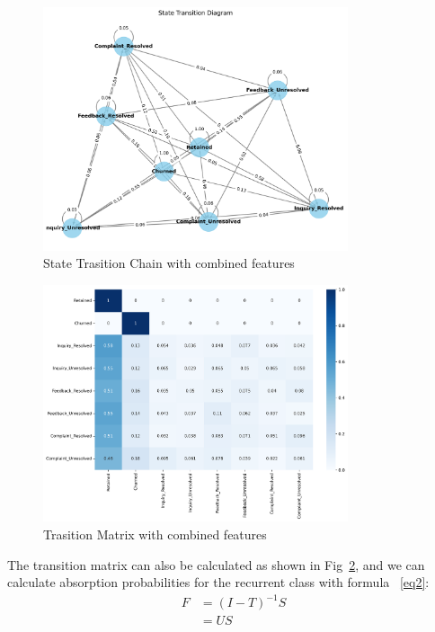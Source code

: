 \documentclass[journal=gmj]{CUP-JNL-DTM}%
\theoremstyle{definition}
\numberwithin{equation}{section}
\begin{document}
\begin{figure}[h]
    \centering
    \includegraphics[width=0.8\textwidth]{Plots/chain_interactiontype.png}
    
    \caption{State Trasition Chain with combined features}
    \label{fig:interactiontype_chain}
\end{figure}

\begin{figure}[h]
    \centering
    \includegraphics[width=0.8\textwidth]{Plots/transition_matrix.png}
    
    \caption{Trasition Matrix with combined features}
    \label{fig:transition_matrix}
\end{figure}

The transition matrix can also be calculated as shown in Fig~\ref{fig:transition_matrix}, and we can calculate absorption probabilities for the recurrent class with formula ~\ref{eq2}:
\begin{equation}
\begin{aligned}
F & =(I-T)^{-1} S \\
& =U S
\label{eq2}
\end{aligned}
\end{equation}
\end{document}
